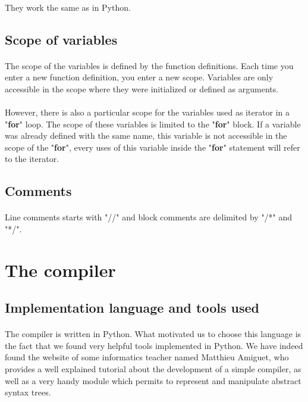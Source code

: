 \documentclass[12pt,a4paper]{article}
\begin{document}
\paragraph{}
They work the same as in Python.

\subsection{Scope of variables}

\paragraph{}
The scope of the variables is defined by the function definitions. Each time you enter a new function definition, you enter a new scope. Variables are only accessible in the scope where they were initialized or defined as arguments.

\paragraph{}
However, there is also a particular scope for the variables used as iterator in a "\textbf{for}" loop. The scope of these variables is limited to the "\textbf{for}" block. If a variable was already defined with the same name, this variable is not accessible in the scope of the "\textbf{for}", every uses of this variable inside the "\textbf{for}" statement will refer to the iterator.

\subsection{Comments}

\paragraph{}
Line comments starts with "//" and block comments are delimited by "/*" and "*/".


\section{The compiler}

\subsection{Implementation language and tools used}

\paragraph{}
The compiler is written in Python. What motivated us to choose this language is the fact that we found very helpful tools implemented in Python. We have indeed found the website of some informatics teacher named Matthieu Amiguet, who provides a well explained tutorial about the development of a simple compiler, as well as a very handy module which permits to represent and manipulate abstract syntax trees.  
\end{document}
